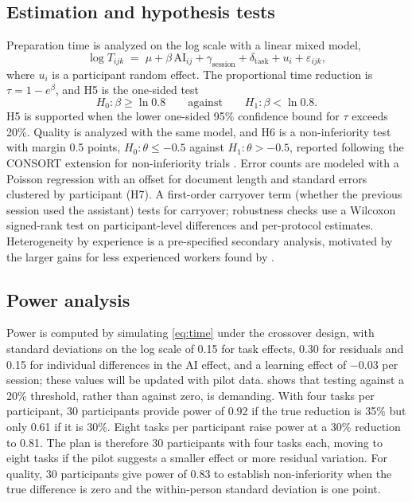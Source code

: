 \documentclass[11pt]{article}
\begin{document}
\subsection{Estimation and hypothesis tests}
Preparation time is analyzed on the log scale with a linear mixed model,
\begin{equation}\label{eq:time}
\log T_{ijk} \;=\; \mu + \beta\, \mathrm{AI}_{ij} + \gamma_{\mathrm{session}} + \delta_{\mathrm{task}} + u_{i} + \varepsilon_{ijk},
\end{equation}
where $u_i$ is a participant random effect. The proportional time reduction is $\tau = 1 - e^{\beta}$, and H5 is the one-sided test
\begin{equation}\label{eq:h5}
H_{0}\!: \beta \geq \ln 0.8 \qquad \text{against} \qquad H_{1}\!: \beta < \ln 0.8 .
\end{equation}
H5 is supported when the lower one-sided 95\% confidence bound for $\tau$ exceeds 20\%. Quality is analyzed with the same model, and H6 is a non-inferiority test with margin 0.5 points, $H_0\!: \theta \leq -0.5$ against $H_1\!: \theta > -0.5$, reported following the CONSORT extension for non-inferiority trials \citep{piaggio2012noninferiority}. Error counts are modeled with a Poisson regression with an offset for document length and standard errors clustered by participant (H7). A first-order carryover term (whether the previous session used the assistant) tests for carryover; robustness checks use a Wilcoxon signed-rank test on participant-level differences and per-protocol estimates. Heterogeneity by experience is a pre-specified secondary analysis, motivated by the larger gains for less experienced workers found by \citet{brynjolfsson2025genai}.

\subsection{Power analysis}
Power is computed by simulating \cref{eq:time} under the crossover design, with standard deviations on the log scale of 0.15 for task effects, 0.30 for residuals and 0.15 for individual differences in the AI effect, and a learning effect of $-0.03$ per session; these values will be updated with pilot data.  shows that testing against a 20\% threshold, rather than against zero, is demanding. With four tasks per participant, 30 participants provide power of 0.92 if the true reduction is 35\% but only 0.61 if it is 30\%. Eight tasks per participant raise power at a 30\% reduction to 0.81. The plan is therefore 30 participants with four tasks each, moving to eight tasks if the pilot suggests a smaller effect or more residual variation. For quality, 30 participants give power of 0.83 to establish non-inferiority when the true difference is zero and the within-person standard deviation is one point.
\end{document}
